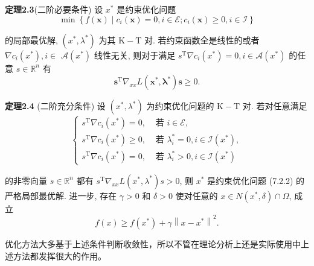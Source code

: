 \textbf{定理2.3}(二阶必要条件) 设 $x^{*}$ 是约束优化问题
$$
\min \left\{f(\boldsymbol{x}) \mid c_{i}(\boldsymbol{x})=0, i \in \mathcal{E} ; c_{i}(\boldsymbol{x}) \geqslant 0, i \in \mathcal{I}\right\}
$$

的局部最优解, $\left(x^{*}, \lambda^{*}\right)$ 为其 $\mathrm{K}-\mathrm{T}$ 对. 若约束函数全是线性的或者 $\nabla c_{i}\left(x^{*}\right), i \in$ $\mathcal{A}\left(x^{*}\right)$ 线性无关, 则对于满足 $s^{\mathrm{T}} \nabla c_{i}\left(x^{*}\right)=0, i \in \mathcal{A}\left(x^{*}\right)$ 的任意 $s \in \mathbb{R}^{n}$ 有
$$
\boldsymbol{s}^{\mathrm{T}} \nabla_{x x} L\left(\boldsymbol{x}^{*}, \boldsymbol{\lambda}^{*}\right) \boldsymbol{s} \geqslant 0 .
$$

\textbf{定理2.4} (二阶充分条件) 设 $\left(x^{*}, \lambda^{*}\right)$ 为约束优化问题的 $\mathrm{K}-\mathrm{T}$ 对. 若对任意满足
$$
\begin{cases}s^{\mathrm{T}} \nabla c_{i}\left(x^{*}\right)=0, & \text { 若 } i \in \mathcal{E}, \\ s^{\mathrm{T}} \nabla c_{i}\left(x^{*}\right) \geqslant 0, & \text { 若 } \lambda_{i}^{*}=0, i \in \mathcal{I}\left(x^{*}\right), \\ s^{\mathrm{T}} \nabla c_{i}\left(x^{*}\right)=0, & \text { 若 } \lambda_{i}^{*}>0, i \in \mathcal{I}\left(x^{*}\right)\end{cases}
$$

的非零向量 $s \in \mathbb{R}^{n}$ 都有 $s^{\mathrm{T}} \nabla_{x x} L\left(x^{*}, \lambda^{*}\right) s>0$, 则 $x^{*}$ 是约束优化问题 (7.2.2) 的 严格局部最优解. 进一步, 存在 $\gamma>0$ 和 $\delta>0$ 使对任意的 $x \in N\left(x^{*}, \delta\right) \cap \Omega$, 成立
$$
f(x) \geqslant f\left(x^{*}\right)+\gamma\left\|x-x^{*}\right\|^{2} .
$$

优化方法大多基于上述条件判断收敛性，所以不管在理论分析上还是实际使用中上述方法都发挥很大的作用。
